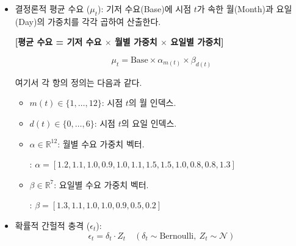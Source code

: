 \documentclass[a4paper, 11pt]{article}
\begin{document}
\begin{itemize}
    \item 결정론적 평균 수요 ($\mu_t$):
    기저 수요(Base)에 시점 $t$가 속한 월(Month)과 요일(Day)의 가중치를 각각 곱하여 산출한다.
    
    \begin{center}
        \textbf{[평균 수요 = 기저 수요 $\times$ 월별 가중치 $\times$ 요일별 가중치]}
    \end{center}
    
    \begin{equation}
        \mu_t = \text{Base} \times \alpha_{m(t)} \times \beta_{d(t)}
    \end{equation}
    
    여기서 각 항의 정의는 다음과 같다.
    \begin{itemize}
        \item $m(t) \in \{1, \dots, 12\}$: 시점 $t$의 월 인덱스.
        \item $d(t) \in \{0, \dots, 6\}$: 시점 $t$의 요일 인덱스.
        \item $\alpha \in \mathbb{R}^{12}$: 월별 수요 가중치 벡터.
        \begin{itemize}
            : $\alpha = [1.2, 1.1, 1.0, 0.9, 1.0, 1.1, \mathbf{1.5, 1.5}, 1.0, \mathbf{0.8, 0.8}, 1.3]$
        \end{itemize}
        \item $\beta \in \mathbb{R}^7$: 요일별 수요 가중치 벡터.
        \begin{itemize}
            : $\beta = [1.3, 1.1, 1.0, 1.0, 0.9, 0.5, 0.2]$
        \end{itemize}
    \end{itemize}
    
    \item 확률적 간헐적 충격 ($\epsilon_t$):
    \begin{equation}
        \epsilon_t = \delta_t \cdot Z_t \quad (\delta_t \sim \text{Bernoulli}, \ Z_t \sim \mathcal{N})
    \end{equation}
\end{itemize}
\end{document}
